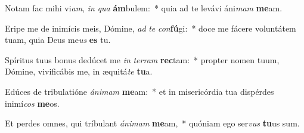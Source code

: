 \item Notam fac mihi vi\textit{am}, \textit{in} \textit{qua} \textbf{ám}bulem:~* quia ad te levávi áni\textit{mam} \textbf{me}am.
\item Eripe me de inimícis meis, Dómine, \textit{ad} \textit{te} \textit{con}\textbf{fú}gi:~* doce me fácere voluntátem tuam, quia Deus me\textit{us} \textbf{es} tu.
\item Spíritus tuus bonus dedúcet me \textit{in} \textit{ter}\textit{ram} \textbf{rec}tam:~* propter nomen tuum, Dómine, vivificábis me, in æquitá\textit{te} \textbf{tu}a.
\item Edúces de tribulatióne \textit{á}\textit{ni}\textit{mam} \textbf{me}am:~* et in misericórdia tua dispérdes inimí\textit{cos} \textbf{me}os.
\item Et perdes omnes, qui tríbulant \textit{á}\textit{ni}\textit{mam} \textbf{me}am,~* quóniam ego ser\textit{vus} \textbf{tu}us sum.
